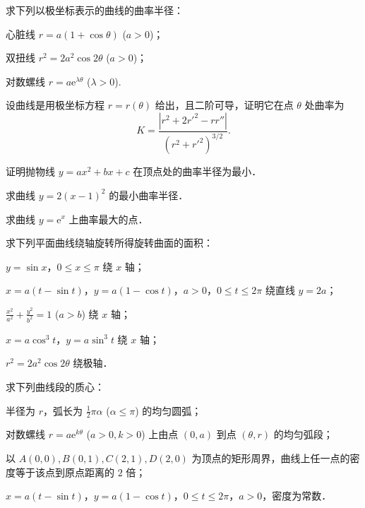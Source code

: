\begin{xiti}
\item 求下列以极坐标表示的曲线的曲率半径：
\begin{ziti}
\item 心脏线 $r = a(1 + \cos\theta)$ ($a > 0$)；
\item 双扭线 $r^2 = 2a^2\cos 2\theta$ ($a > 0$)；
\item 对数螺线 $r = a\mathrm{e}^{\lambda\theta}$ ($\lambda > 0$).
\end{ziti}

\item 设曲线是用极坐标方程 $r = r(\theta)$ 给出，且二阶可导，证明它在点 $\theta$ 处曲率为
\[
K = \frac{|r^2 + 2r'^2 - r r''|}{(r^2 + r'^2)^{3/2}}.
\]

\item 证明抛物线 $y = ax^2 + bx + c$ 在顶点处的曲率半径为最小．

\item 求曲线 $y = 2(x - 1)^2$ 的最小曲率半径．

\item 求曲线 $y = \mathrm{e}^x$ 上曲率最大的点．

\item 求下列平面曲线绕轴旋转所得旋转曲面的面积：
\begin{ziti}
\item $y = \sin x$，$0 \leqslant x \leqslant \pi$ 绕 $x$ 轴；
\item $x = a(t - \sin t)$，$y = a(1 - \cos t)$，$a > 0$，$0 \leqslant t \leqslant 2\pi$ 绕直线 $y = 2a$；
\item $\frac{x^2}{a^2} + \frac{y^2}{b^2} = 1$ ($a > b$) 绕 $x$ 轴；
\item $x = a\cos^3 t$，$y = a\sin^3 t$ 绕 $x$ 轴；
\item $r^2 = 2a^2\cos 2\theta$ 绕极轴．
\end{ziti}

\item 求下列曲线段的质心：
\begin{ziti}
\item 半径为 $r$，弧长为 $\frac{1}{2}\pi\alpha$ ($\alpha \leqslant \pi$) 的均匀圆弧；
\item 对数螺线 $r = a\mathrm{e}^{k\theta}$ ($a > 0, k > 0$) 上由点 $(0, a)$ 到点 $(\theta, r)$ 的均匀弧段；
\item 以 $A(0,0), B(0,1), C(2,1), D(2,0)$ 为顶点的矩形周界，曲线上任一点的密度等于该点到原点距离的 $2$ 倍；
\item $x = a(t - \sin t)$，$y = a(1 - \cos t)$，$0 \leqslant t \leqslant 2\pi$，$a > 0$，密度为常数．
\end{ziti}


\end{xiti}
